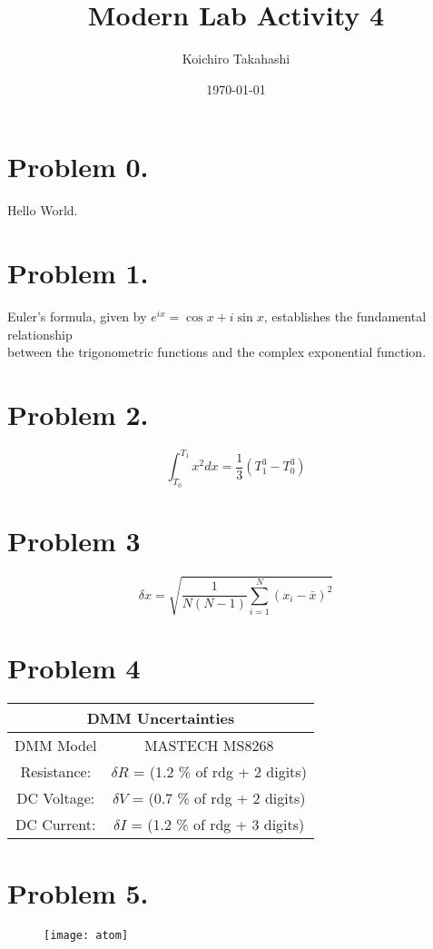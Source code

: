 \documentclass{article}
\begin{document}
	
\title{Modern Lab Activity 4}
\author{Koichiro Takahashi}
\date{\today}
	
\maketitle 
	
\section{Problem 0.}

Hello World.

\section*{Problem 1.}

\noindent Euler's formula, given by $e^{ix} = \cos{x} + i\sin{x}$, establishes the fundamental relationship\\
between the trigonometric functions and the complex exponential function.

\section*{Problem 2.}

$$ \int_{T_0}^{T_1} x^2 dx = \frac{1}{3} \left(T_1^3 - T_0^3\right) $$

\section*{Problem 3}

\begin{equation}
\delta x = \sqrt{ \frac{1}{N\left(N-1\right)} \sum_{i=1}^{N} \left(x_i - \bar{x}\right)^2 }
\end{equation}

\section*{Problem 4}
\begin{center}
\begin{tabular}{|c|c|}
	\hline
	\multicolumn{2}{|c|}{DMM Uncertainties} \\
	\hline
	DMM Model & MASTECH MS8268\\
	\hline
	Resistance: &  $\delta R $ = (1.2 \% of rdg + 2 digits)\\
	\hline
	DC Voltage: & $\delta V $ = (0.7 \% of rdg + 2 digits)\\
	\hline
	DC Current: & $\delta I $ = (1.2 \% of rdg + 3 digits)\\
	\hline
\end{tabular}
\end{center}

\pagebreak

\section*{Problem 5.}

\begin{figure}[h]
	\centering
	\texttt{[image: atom]}
	\label{fig:atom}
\end{figure}
\end{document}
